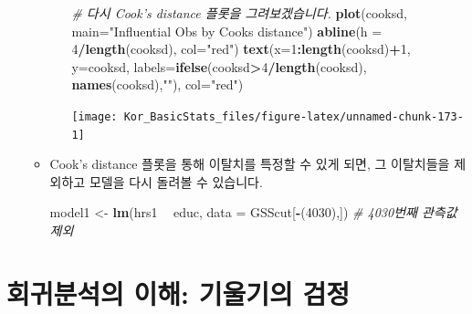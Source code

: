 \documentclass[]{book}
\newenvironment{Shaded}{\begin{snugshade}}{\end{snugshade}}
\newcommand{\CommentTok}[1]{\textcolor[rgb]{0.56,0.35,0.01}{\textit{#1}}}
\newcommand{\DataTypeTok}[1]{\textcolor[rgb]{0.13,0.29,0.53}{#1}}
\newcommand{\DecValTok}[1]{\textcolor[rgb]{0.00,0.00,0.81}{#1}}
\newcommand{\KeywordTok}[1]{\textcolor[rgb]{0.13,0.29,0.53}{\textbf{#1}}}
\newcommand{\NormalTok}[1]{#1}
\newcommand{\OperatorTok}[1]{\textcolor[rgb]{0.81,0.36,0.00}{\textbf{#1}}}
\newcommand{\StringTok}[1]{\textcolor[rgb]{0.31,0.60,0.02}{#1}}
\begin{document}
\begin{itemize}
\begin{itemize}
\begin{itemize}
\begin{Shaded}
\begin{Highlighting}[]
\CommentTok{# 다시 Cook's distance 플롯을 그려보겠습니다.}
\KeywordTok{plot}\NormalTok{(cooksd, }\DataTypeTok{main=}\StringTok{"Influential Obs by Cooks distance"}\NormalTok{)  }
\KeywordTok{abline}\NormalTok{(}\DataTypeTok{h =} \DecValTok{4}\OperatorTok{/}\KeywordTok{length}\NormalTok{(cooksd), }\DataTypeTok{col=}\StringTok{"red"}\NormalTok{)}
\KeywordTok{text}\NormalTok{(}\DataTypeTok{x=}\DecValTok{1}\OperatorTok{:}\KeywordTok{length}\NormalTok{(cooksd)}\OperatorTok{+}\DecValTok{1}\NormalTok{, }\DataTypeTok{y=}\NormalTok{cooksd, }
     \DataTypeTok{labels=}\KeywordTok{ifelse}\NormalTok{(cooksd}\OperatorTok{>}\DecValTok{4}\OperatorTok{/}\KeywordTok{length}\NormalTok{(cooksd), }
                   \KeywordTok{names}\NormalTok{(cooksd),}\StringTok{""}\NormalTok{), }\DataTypeTok{col=}\StringTok{"red"}\NormalTok{)}
\end{Highlighting}
\end{Shaded}

      \begin{center}\texttt{[image: Kor\_BasicStats\_files/figure-latex/unnamed-chunk-173-1]} \end{center}
    \end{itemize}
  \item
    Cook's distance 플롯을 통해 이탈치를 특정할 수 있게 되면, 그 이탈치들을 제외하고 모델을 다시 돌려볼 수 있습니다.

\begin{Shaded}
\begin{Highlighting}[]
\NormalTok{model1 <-}\StringTok{ }\KeywordTok{lm}\NormalTok{(hrs1 }\OperatorTok{~}\StringTok{ }\NormalTok{educ, }\DataTypeTok{data =}\NormalTok{ GSScut[}\OperatorTok{-}\NormalTok{(}\DecValTok{4030}\NormalTok{),]) }\CommentTok{# 4030번째 관측값 제외}
\end{Highlighting}
\end{Shaded}
  \end{itemize}
\end{itemize}

\hypertarget{uxd68cuxadc0uxbd84uxc11duxc758-uxc774uxd574-uxae30uxc6b8uxae30uxc758-uxac80uxc815}{%
\section{회귀분석의 이해: 기울기의 검정}\label{uxd68cuxadc0uxbd84uxc11duxc758-uxc774uxd574-uxae30uxc6b8uxae30uxc758-uxac80uxc815}}
\end{document}
